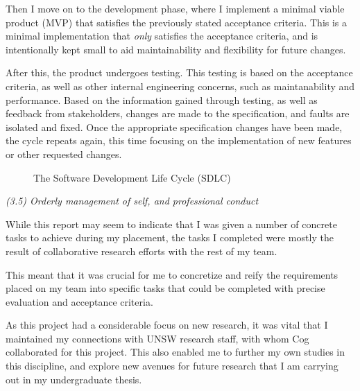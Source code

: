 \documentclass{report}
\newcommand*{\mytextstyle}{\sffamily\Large\bfseries\color{black!85}}
\newcommand{\arcarrow}[8]{%
  \pgfmathsetmacro{\rin}{#1}
  \pgfmathsetmacro{\rmid}{#2}
  \pgfmathsetmacro{\rout}{#3}
  \pgfmathsetmacro{\astart}{#4}
  \pgfmathsetmacro{\aend}{#5}
  \pgfmathsetmacro{\atip}{#6}
  \fill[#7] (\astart:\rin) arc (\astart:\aend:\rin)
       -- (\aend+\atip:\rmid) -- (\aend:\rout) arc (\aend:\astart:\rout)
       -- (\astart+\atip:\rmid) -- cycle;
  \path[font = \sffamily, decoration = {text along path, text = {|\mytextstyle|#8},
    text align = {align = center}, raise = -0.5ex}, decorate]
    (\astart+\atip:\rmid) arc (\astart+\atip:\aend+\atip:\rmid);
}
\begin{document}
Then I move on to the development phase, where I implement a minimal viable product (MVP)
that satisfies the previously stated acceptance criteria. This is a minimal implementation 
that \emph{only} satisfies the acceptance criteria, and is intentionally kept small to aid maintainability 
and flexibility for future changes.

After this, the product undergoes testing. This testing is based on the acceptance criteria,
as well as other internal engineering concerns, such as maintanability and performance.
Based on the information gained through testing, as well as feedback from stakeholders,
changes are made to the specification, and faults are isolated and fixed. Once the appropriate
specification changes have been made, the cycle repeats again, this time focusing on the implementation
of new features or other requested changes.

\begin{figure}
    \centering
{}
\caption{The Software Development Life Cycle (SDLC)}
\label{fig:sdlc}
\end{figure}

\textit{(3.5) Orderly management of self, and professional conduct}

While this report may seem to indicate that I was given a number of concrete tasks to achieve 
during my placement, the tasks I completed were mostly the result of collaborative research 
efforts with the rest of my team. 

This meant that it was crucial for me to concretize and reify the requirements placed on my 
team into specific tasks that could be completed with precise evaluation and acceptance criteria.

As this project had a considerable focus on new research, it was vital that I maintained my connections
with UNSW research staff, with whom Cog collaborated for this project. This also enabled me to 
further my own studies in this discipline, and explore new avenues for future research that I 
am carrying out in my undergraduate thesis.
\end{document}
